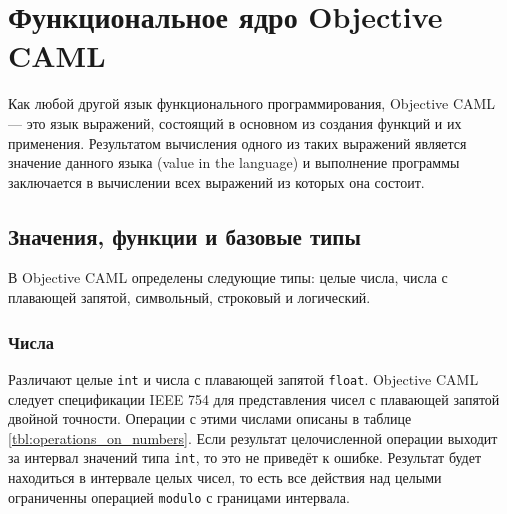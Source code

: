 \section{Функциональное ядро Objective CAML}
\label{sec:caml_kernel}

Как любой другой язык функционального программирования, Objective CAML --- это
язык выражений, состоящий в основном из создания функций и их применения.
Результатом вычисления одного из таких выражений является значение данного языка
(value in the language) и выполнение программы заключается в вычислении всех
выражений из которых она состоит.

\subsection{Значения, функции и базовые типы}
\label{sec:values_funcs_base_types}

В Objective CAML определены следующие типы: целые числа, числа с плавающей
запятой, символьный, строковый и логический.

\subsubsection{Числа}

Различают целые \texttt{int} и числа с плавающей запятой \texttt{float}.
Objective CAML следует спецификации IEEE 754 для представления чисел с плавающей
запятой двойной точности. Операции с этими числами описаны в таблице
\ref{tbl:operations_on_numbers}. Если результат целочисленной операции выходит
за интервал значений типа \texttt{int}, то это не приведёт к ошибке. Результат
будет находиться в интервале целых чисел, то есть все действия над целыми
ограниченны операцией \texttt{modulo} с границами интервала.

